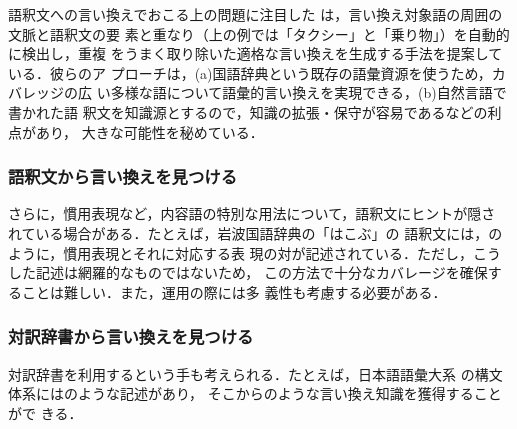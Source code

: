 語釈文への言い換えでおこる上の問題に注目した
は，言い換え対象語の周囲の文脈と語釈文の要
素と重なり（上の例では「タクシー」と「乗り物」）を自動的に検出し，重複
をうまく取り除いた適格な言い換えを生成する手法を提案している．彼らのア
プローチは，(a)国語辞典という既存の語彙資源を使うため，カバレッジの広
い多様な語について語彙的言い換えを実現できる，(b)自然言語で書かれた語
釈文を知識源とするので，知識の拡張・保守が容易であるなどの利点があり，
大きな可能性を秘めている．

\subsubsection{語釈文から言い換えを見つける}

さらに，慣用表現など，内容語の特別な用法について，語釈文にヒントが隠さ
れている場合がある．たとえば，岩波国語辞典\cite{RWC:98}の「はこぶ」の
語釈文には，のように，慣用表現とそれに対応する表
現の対が記述されている．ただし，こうした記述は網羅的なものではないため，
この方法で十分なカバレージを確保することは難しい．また，運用の際には多
義性も考慮する必要がある．

\subsubsection{対訳辞書から言い換えを見つける}

対訳辞書を利用するという手も考えられる．たとえば，日本語語彙大系
\cite{NTT:97}の構文体系にはのような記述があり，
そこからのような言い換え知識を獲得することがで
きる．

